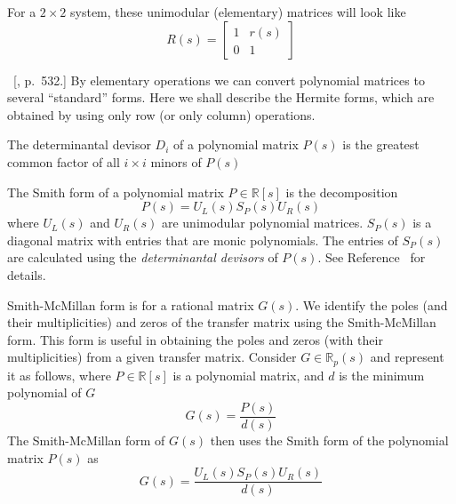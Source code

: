 \begin{example}
  For a $2\times2$ system, these unimodular (elementary) matrices will look like
  \begin{equation*}
  R(s)=
  \begin{bmatrix}
    1 & r(s) \\
    0 & 1
  \end{bmatrix}
  \end{equation*}
\end{example}

\begin{defn-dan}~[\cite{antsaklis.linearsystems.2006}, p.~532.]
  By elementary operations we can convert polynomial matrices to several ``standard'' forms.
  Here we shall describe the Hermite forms, which are obtained by using only row (or only column) operations.
\end{defn-dan}

\begin{defn-dan}
  The determinantal devisor $D_{i}$ of a polynomial matrix $P(s)$ is the greatest common factor of all $i\times i$ minors of $P(s)$
\end{defn-dan}

\begin{defn-dan}
  The Smith form of a polynomial matrix $P\in\mathbb{R}[s]$ is the decomposition
  \begin{equation*}
    P(s)=U_{L}(s)S_{P}(s)U_{R}(s)
  \end{equation*}
  where $U_{L}(s)$ and $U_{R}(s)$ are unimodular polynomial matrices.
  $S_{P}(s)$ is a diagonal matrix with entries that are monic polynomials.
  The entries of $S_{P}(s)$ are calculated using the \textit{determinantal devisors} of $P(s)$.
  See Reference~\cite{antsaklis.linearsystems.2006} for details.
\end{defn-dan}

\begin{defn-dan}
  Smith-McMillan form is for a rational matrix $G(s)$.
  We identify the poles (and their multiplicities) and zeros of the transfer matrix using the Smith-McMillan form.
  This form is useful in obtaining the poles and zeros (with their multiplicities) from a given transfer matrix.
  Consider $G\in\mathbb{R}_{p}(s)$ and represent it as follows, where $P\in\mathbb{R}[s]$ is a polynomial matrix, and $d$ is the minimum polynomial of $G$
  \begin{equation*}
    G(s)=\frac{P(s)}{d(s)}
  \end{equation*}
  The Smith-McMillan form of $G(s)$ then uses the Smith form of the polynomial matrix $P(s)$ as
  \begin{equation*}
    G(s)=\frac{U_{L}(s)S_{P}(s)U_{R}(s)}{d(s)}
  \end{equation*}
\end{defn-dan}

